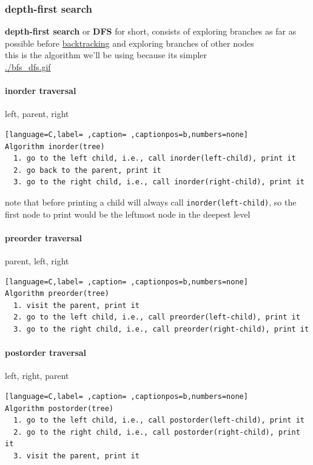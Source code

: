 \documentclass[a4paper,12pt]{article}
\begin{document}
\subsubsection{depth-first search}
\label{sec:org9c80d34}
\textbf{depth-first search} or \textbf{DFS} for short, consists of exploring branches as far as possible before \hyperref[sec:orgee54fe7]{backtracking} and exploring branches of other nodes\\[0pt]
this is the algorithm we'll be using because its simpler\\[0pt]
\url{./bfs\_dfs.gif}\\[0pt]
\paragraph{inorder traversal}
\label{sec:org719f705}
left, parent, right\\[0pt]
\begin{lstlisting}[language=C,label= ,caption= ,captionpos=b,numbers=none]
Algorithm inorder(tree)
  1. go to the left child, i.e., call inorder(left-child), print it
  2. go back to the parent, print it
  3. go to the right child, i.e., call inorder(right-child), print it
\end{lstlisting}
\begin{note}
note that before printing a child will always call \texttt{inorder(left-child)}, so the first node to print would be the leftmost node in the deepest level\\[0pt]
\end{note}
\paragraph{preorder traversal}
\label{sec:org8b23efe}
parent, left, right\\[0pt]
\begin{lstlisting}[language=C,label= ,caption= ,captionpos=b,numbers=none]
Algorithm preorder(tree)
  1. visit the parent, print it
  2. go to the left child, i.e., call preorder(left-child), print it
  3. go to the right child, i.e., call preorder(right-child), print it
\end{lstlisting}
\paragraph{postorder traversal}
\label{sec:orgdf98ea5}
left, right, parent\\[0pt]
\begin{lstlisting}[language=C,label= ,caption= ,captionpos=b,numbers=none]
Algorithm postorder(tree)
  1. go to the left child, i.e., call postorder(left-child), print it
  2. go to the right child, i.e., call postorder(right-child), print it
  3. visit the parent, print it
\end{lstlisting}
\end{document}
